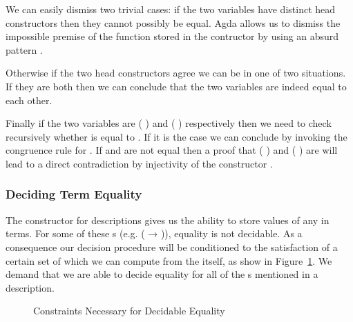 \begin{agdasnippet}
\end{agdasnippet}

We can easily dismiss two trivial cases: if the two variables have distinct
head constructors then they cannot possibly be equal. Agda allows us to
dismiss the impossible premise of the function stored in the 
contructor by using an absurd pattern \AS{()}.

\begin{agdasnippet}
\end{agdasnippet}

Otherwise if the two head constructors agree we can be in one of two
situations. If they are both  then we can conclude that the two
variables are indeed equal to each other.

\begin{agdasnippet}
\end{agdasnippet}

Finally if the two variables are {( )} and {( )}
respectively then we need to check recursively whether  is equal
to . If it is the case we can conclude by invoking the congruence
rule for . If  and  are not equal then a proof that
{( )} and {( )} are will lead to a direct
contradiction by injectivity of the constructor .

\begin{agdasnippet}
\end{agdasnippet}

\subsubsection{Deciding Term Equality}

The constructor  for descriptions gives us the ability to store
values of any  in terms. For some of these s (e.g.
{( → )}), equality is not decidable. As a consequence
our decision procedure will be conditioned to the satisfaction of a
certain set of  which we can compute from the 
itself, as show in Figure~\ref{fig:eqconstraints}. We demand that we are
able to decide equality for all of the s mentioned in a description.

\begin{figure}[h]
\caption{Constraints Necessary for Decidable Equality}\label{fig:eqconstraints}
\end{figure}


